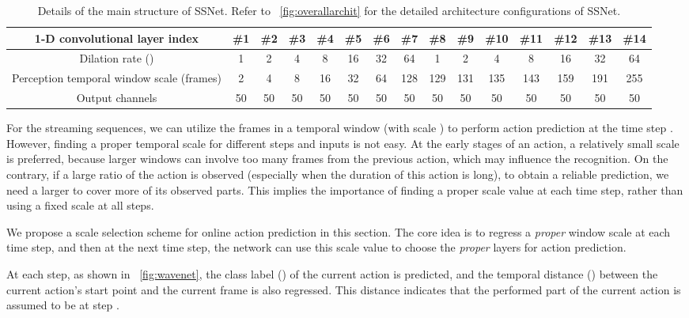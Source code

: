 \documentclass[10pt,twocolumn,letterpaper]{article}
\begin{document}
\begin{table*}[!tp]
\caption{Details of the main structure of SSNet. Refer to \figurename{~\ref{fig:overallarchit}} for the detailed architecture configurations of SSNet.}
\label{table:ssnetdetails}
\centering
\small
\begin{tabular}{ccccccccccccccc}
\toprule
1-D convolutional layer index                  & \#1 & \#2 & \#3  & \#4& \#5& \#6& \#7 & \#8 & \#9 &\#10 & \#11& \#12& \#13& \#14 \\
\midrule
Dilation rate ()                          &   1 &   2 &   4  & 8  & 16 & 32 & 64  & 1   & 2   &   4 & 8   & 16  & 32  & 64 \\
Perception temporal window scale (frames)      &   2 &   4 &   8  & 16 & 32 & 64 & 128 & 129 & 131 & 135 & 143 & 159 & 191 & 255 \\
Output channels                                &  50 &  50 &  50  & 50 & 50 & 50 &  50 &  50 &  50 &  50 &  50 &  50 &  50 &  50 \\
\bottomrule
\end{tabular}
\end{table*}

For the streaming sequences,
we can utilize the frames in a temporal window  (with scale ) to perform action prediction at the time step .
However, finding a proper temporal scale  for different steps and inputs is not easy.
At the early stages of an action,
a relatively small scale is preferred,
because larger windows can involve too many frames from the previous action, which may influence the recognition.
On the contrary, if a large ratio of the action is observed
(especially when the duration of this action is long),
to obtain a reliable prediction,
we need a larger  to cover more of its observed parts.
This implies the importance of finding a proper scale value at each time step, rather than using a fixed scale at all steps.

We propose a scale selection scheme for online action prediction in this section. The core idea is to regress a \emph{proper} window scale at each time step,
and then at the next time step,
the network can use this scale value to choose the \emph{proper} layers for action prediction.

At each step, as shown in \figurename{~\ref{fig:wavenet}},
the class label () of the current action is predicted,
and the temporal distance () between the current action's start point and the current frame is also regressed.
This distance indicates that the performed part of the current action is assumed to be  at step .
\end{document}
